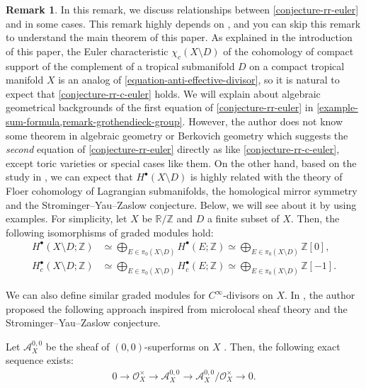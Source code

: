 \documentclass[a4paper,dvipdfmx,reqno,12pt]{amsart}
\theoremstyle{definition}
\newtheorem{remark}[theorem]{Remark}
\numberwithin{equation}{section}
\begin{document}
\begin{remark}
\label{remark-c-infinity-divisor}
In this remark, we discuss relationships
between \cref{conjecture-rr-euler} and 
\cite{tsutsui2023graded} in some cases.
This remark highly depends on
\cite{tsutsui2023graded}, and you can
skip this remark to understand the main theorem of  
this paper. As explained in the introduction of this paper,
the Euler characteristic 
$\chi_c(X\setminus D)$ of
the cohomology of compact support of
the complement of a tropical submanifold $D$ on
a compact tropical manifold $X$ is an analog of  
\cref{equation-anti-effective-divisor}, so 
it is natural to expect that \cref{conjecture-rr-c-euler} holds.
We will explain about algebraic geometrical backgrounds of
the first equation of
\cref{conjecture-rr-euler} in
\cref{example-sum-formula,remark-grothendieck-group}.
However, the author does not know some theorem
in algebraic geometry or Berkovich geometry
which suggests the \emph{second} equation of
\cref{conjecture-rr-euler} directly
as like \cref{conjecture-rr-c-euler},
except toric varieties or special cases like them.
On the other hand, based on the study in \cite{tsutsui2023graded},
we can expect that 
$H^{\bullet}(X\setminus D)$ is highly related with
the theory of Floer cohomology of
Lagrangian submanifolds, the homological mirror symmetry
and the Strominger--Yau--Zaslow conjecture.
Below, we will see about it by using examples. 
For simplicity, let 
$X$ be $\mathbb{R}/\mathbb{Z}$ and $D$ a finite subset of
$X$. Then, the following isomorphisms of graded modules hold:
\begin{align}
H^{\bullet}(X\setminus D;\mathbb{Z}) 
&\simeq \bigoplus_{E\in \pi_0(X\setminus D)} 
H^{\bullet}(E;\mathbb{Z})
\simeq \bigoplus_{E\in \pi_0(X\setminus D)} \mathbb{Z}[0], \\
H_c^{\bullet}(X\setminus D;\mathbb{Z}) 
&\simeq \bigoplus_{E\in \pi_0(X\setminus D)} 
H^{\bullet}_c(E;\mathbb{Z})
\simeq \bigoplus_{E\in \pi_0(X\setminus D)} \mathbb{Z}[-1].
\end{align}

We can also define similar graded modules
for $C^{\infty}$-divisors on $X$.
In \cite{tsutsui2023graded},
the author proposed the following approach
inspired from microlocal sheaf theory and
the Strominger--Yau--Zaslow conjecture.

Let $\mathcal{A}^{0,0}_X$ be the sheaf of
$(0,0)$-superforms on $X$
\cite[Definition 2.24]{MR3903579}.
Then, the following exact sequence exists:
\begin{align}
0\to \mathcal{O}_X^{\times} \to \mathcal{A}^{0,0}_X
\to \mathcal{A}^{0,0}_X/\mathcal{O}_X^{\times} \to 0.
\end{align}


\end{remark}
\end{document}
